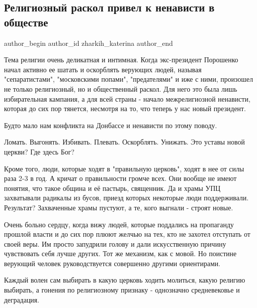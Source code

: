  
 
 
 
 
 
\subsection{Религиозный раскол привел к ненависти в обществе}
\label{sec:21_12_2020.fb.zharkih_katerina.1.religiozny_raskol}
\ifcmt
	author_begin
   author_id zharkih_katerina
	author_end
\fi

Тема религии очень деликатная и интимная. Когда экс-президент Порошенко начал
активно ее шатать и оскорблять верующих людей, называя "сепаратистами",
"московскими попами", "предателями" и иже с ними, произошел не только
религиозный, но и общественный раскол. Для него это была лишь избирательная
кампания, а для всей страны - начало межрелигиозной ненависти, которая до сих
пор тянется, несмотря на то, что теперь у нас новый президент.

Будто мало нам конфликта на Донбассе и ненависти по этому поводу. 

Ломать. Выгонять. Избивать. Плевать. Оскорблять. Унижать. Это уставы новой церкви? Где здесь Бог? 

Кроме того, люди, которые ходят в "правильную церковь", ходят в нее от силы
раза 2-3 в год. А кричат о правильности громче всех. Они вообще не имеют
понятия, что такое община и её пастырь, священник. Да и храмы УПЦ захватывали
радикалы из бусов, приезд которых некоторые люди поддерживали. Результат?
Захваченные храмы пустуют, а те, кого выгнали - строят новые. 

Очень больно сердцу, когда вижу людей, которые поддались на пропаганду прошлой
власти и до сих пор плюют желчью на тех, кто не захотел отступать от своей
веры. Им просто запудрили голову и дали искусственную причину чувствовать себя
лучше других. Тот же механизм, как с мовой. Но поистине верующий человек
руководствуется совершенно другими ориентирами.     

Каждый волен сам выбирать в какую  церковь ходить молиться, какую религию
выбирать, а гонения по религиозному признаку - однозначно средневековье и
деградация.

